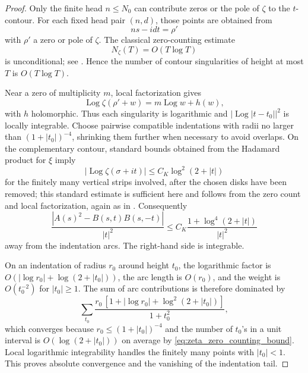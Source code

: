 \documentclass[11pt]{amsart}
\numberwithin{equation}{section}
\theoremstyle{plain}
\theoremstyle{definition}
\theoremstyle{remark}
\newcommand{\Log}{\operatorname{Log}}
\begin{document}
\begin{proof}
Only the finite head \(n\le N_0\) can contribute zeros or the pole of
\(\zeta\) to the \(t\)-contour.  For each fixed head pair \((n,d)\), those
points are obtained from
\begin{equation}
ns-idt=\rho'
\label{eq:head_contour_zero_equation}
\end{equation}
with \(\rho'\) a zero or pole of \(\zeta\).  The classical zero-counting
estimate
\begin{equation}
N_\zeta(T)=O(T\log T)
\label{eq:zeta_zero_counting_bound}
\end{equation}
is unconditional; see \cite{Titchmarsh1986}.  Hence the number of contour
singularities of height at most \(T\) is \(O(T\log T)\).

Near a zero of multiplicity \(m\), local factorization gives
\begin{equation}
\Log\zeta(\rho'+w)=m\Log w+h(w),
\label{eq:local_logzeta_factorization}
\end{equation}
with \(h\) holomorphic.  Thus each singularity is logarithmic and
\(|\Log|t-t_0||^2\) is locally integrable.  Choose pairwise compatible
indentations with radii no larger than \((1+|t_0|)^{-4}\), shrinking them
further when necessary to avoid overlaps.  On the complementary contour,
standard bounds obtained from the Hadamard product for \(\xi\) imply
\begin{equation}
|\Log\zeta(\sigma+it)|
\le C_K\log^2(2+|t|)
\label{eq:logzeta_contour_growth}
\end{equation}
for the finitely many vertical strips involved, after the chosen disks have
been removed; this standard estimate is sufficient here and follows from the
zero count and local factorization, again as in \cite{Titchmarsh1986}.
Consequently
\begin{equation}
\frac{|A(s)^2-B(s,t)B(s,-t)|}{|t|^2}
\le
C_K\frac{1+\log^4(2+|t|)}{|t|^2}
\label{eq:I_tail_contour_majorant}
\end{equation}
away from the indentation arcs.  The right-hand side is integrable.

On an indentation of radius \(r_0\) around height \(t_0\), the logarithmic
factor is \(O(|\log r_0|+\log(2+|t_0|))\), the arc length is \(O(r_0)\), and
the weight is \(O(t_0^{-2})\) for \(|t_0|\ge1\).  The sum of arc
contributions is therefore dominated by
\begin{equation}
\sum_{t_0}
\frac{r_0\,[1+|\log r_0|+\log^2(2+|t_0|)]}{1+t_0^2},
\label{eq:indentation_sum_majorant}
\end{equation}
which converges because \(r_0\le(1+|t_0|)^{-4}\) and the number of
\(t_0\)'s in a unit interval is \(O(\log(2+|t_0|))\) on average by
\eqref{eq:zeta_zero_counting_bound}.  Local logarithmic integrability handles
the finitely many points with \(|t_0|<1\).  This proves absolute convergence
and the vanishing of the indentation tail.
\end{proof}
\end{document}
